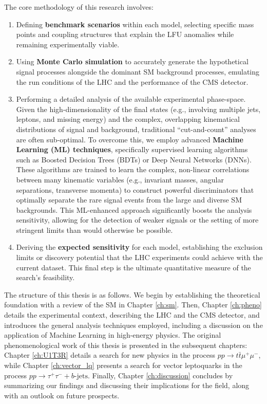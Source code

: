 The core methodology of this research involves:
\begin{enumerate}
    \item Defining \textbf{benchmark scenarios} within each model, selecting specific mass points and coupling structures that explain the LFU anomalies while remaining experimentally viable.
    \item Using \textbf{Monte Carlo simulation} to accurately generate the hypothetical signal processes alongside the dominant SM background processes, emulating the run conditions of the LHC and the performance of the CMS detector.
    \item Performing a detailed analysis of the available experimental phase-space. Given the high-dimensionality of the final states (e.g., involving multiple jets, leptons, and missing energy) and the complex, overlapping kinematical distributions of signal and background, traditional ``cut-and-count'' analyses are often sub-optimal. To overcome this, we employ advanced \textbf{Machine Learning (ML) techniques}, specifically supervised learning algorithms such as Boosted Decision Trees (BDTs) or Deep Neural Networks (DNNs). These algorithms are trained to learn the complex, non-linear correlations between many kinematic variables (e.g., invariant masses, angular separations, transverse momenta) to construct powerful discriminators that optimally separate the rare signal events from the large and diverse SM backgrounds. This ML-enhanced approach significantly boosts the analysis sensitivity, allowing for the detection of weaker signals or the setting of more stringent limits than would otherwise be possible.
    \item Deriving the \textbf{expected sensitivity} for each model, establishing the exclusion limits or discovery potential that the LHC experiments could achieve with the current dataset. This final step is the ultimate quantitative measure of the search's feasibility.
\end{enumerate}

The structure of this thesis is as follows. We begin by establishing the theoretical foundation with a review of the SM in Chapter \ref{ch:sm}. Then, Chapter \ref{ch:pheno} details the experimental context, describing the LHC and the CMS detector, and introduces the general analysis techniques employed, including a discussion on the application of Machine Learning in high-energy physics. The original phenomenological work of this thesis is presented in the subsequent chapters: Chapter \ref{ch:U1T3R} details a search for new physics in the process $pp \to t\bar{t}\mu^+\mu^-$, while Chapter \ref{ch:vector_lq} presents a search for vector leptoquarks in the process $pp \to \tau^+\tau^- + b\text{-jets}$. Finally, Chapter \ref{ch:discussion} concludes by summarizing our findings and discussing their implications for the field, along with an outlook on future prospects.

